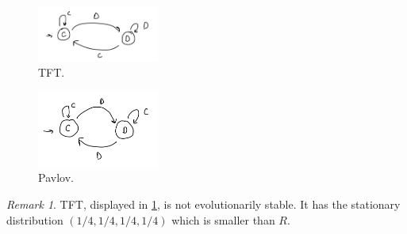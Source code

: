 \documentclass[11pt]{amsart}
\theoremstyle{definition}
\theoremstyle{remark}
\newtheorem*{remark}{Remark}
\begin{document}
\begin{figure}
  \label{tftfigure}
  \includegraphics[width=4cm]{tft.jpg}
  \centering
  \caption{TFT.}
\end{figure}
\begin{figure}
  \label{pavlovfigure}
  \includegraphics[width=4cm]{pavlov.jpg}
  \centering
  \caption{Pavlov.}
\end{figure}

\begin{remark}
  TFT, displayed in \cref{tftfigure}, is not evolutionarily stable. It has the stationary distribution $(1/4,1/4,1/4,1/4)$ which is smaller than $R$.
\end{remark}
\end{document}
